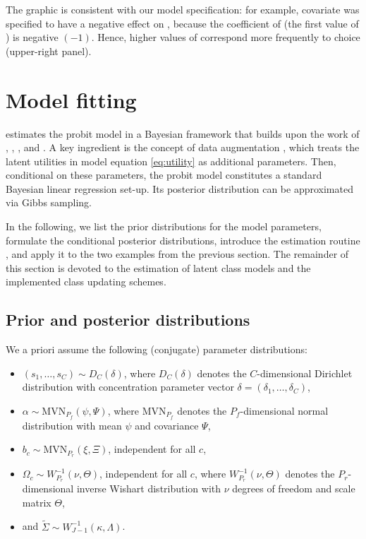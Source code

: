 \documentclass[article]{jss}
\newcommand{\fct}[1]{\code{#1()}}
\begin{document}
The graphic is consistent with our model specification: for example, covariate  was specified to have a negative effect on , because the coefficient of  (the first value of ) is negative $(-1)$. Hence, higher values of  correspond more frequently to choice  (upper-right panel).

\section{Model fitting} \label{sec:model_fitting}

 estimates the probit model in a Bayesian framework that builds upon the work of \cite{McCulloch:1994}, \cite{Nobile:1998}, \cite{Allenby:1998}, and \cite{Imai:2005}. A key ingredient is the concept of data augmentation \citep{Albert:1993}, which treats the latent utilities in model equation \eqref{eq:utility} as additional parameters. Then, conditional on these parameters, the probit model constitutes a standard Bayesian linear regression set-up. Its posterior distribution can be approximated via Gibbs sampling.

In the following, we list the prior distributions for the model parameters, formulate the conditional posterior distributions, introduce the estimation routine \fct{fit\_model}, and apply it to the two examples from the previous section. The remainder of this section is devoted to the estimation of latent class models and the implemented class updating schemes.

\subsection{Prior and posterior distributions} \label{subsec:prior_and_posterior}

We a priori assume the following (conjugate) parameter distributions:
\begin{itemize}
  \item $(s_1,\dots,s_C)\sim D_C(\delta)$, where $D_C(\delta)$ denotes the $C$-dimensional Dirichlet distribution with concentration parameter vector $\delta = (\delta_1,\dots,\delta_C)$,
  \item $\alpha\sim \text{MVN}_{P_f}(\psi,\Psi)$, where $\text{MVN}_{P_f}$ denotes the $P_f$-dimensional normal distribution with mean $\psi$ and covariance $\Psi$,
  \item $b_c \sim \text{MVN}_{P_r}(\xi,\Xi)$, independent for all $c$,
  \item $\Omega_c \sim W^{-1}_{P_r}(\nu,\Theta)$, independent for all $c$, where $W^{-1}_{P_r}(\nu,\Theta)$ denotes the $P_r$-dimensional inverse Wishart distribution with $\nu$ degrees of freedom and scale matrix $\Theta$,
  \item and $\tilde{\Sigma} \sim W^{-1}_{J-1}(\kappa,\Lambda)$.
\end{itemize}
\end{document}
